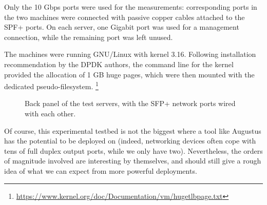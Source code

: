 \documentclass[11pt,a4paper,twoside,titlepage,openany]{book}
\begin{document}
Only the 10 Gbps ports were used for the measurements: corresponding ports in the two machines were connected with passive copper cables attached to the SPF+ ports. On each server, one Gigabit port was used for a management connection, while the remaining port was left unused.

The machines were running GNU/Linux with kernel 3.16. Following installation recommendation by the DPDK authors, the command line for the kernel provided the allocation of 1 GB huge pages, which were then mounted with the dedicated pseudo-filesystem.%
\footnote{\url{https://www.kernel.org/doc/Documentation/vm/hugetlbpage.txt}}

\begin{figure}[tb]
  \begin{center}
    \caption[Back panel of the test servers]{Back panel of the test servers, with the SFP+ network ports wired with each other.}
    \label{fig:test.servers_backpane}
  \end{center}
\end{figure}

Of course, this experimental testbed is not the biggest where a tool like Augustus has the potential to be deployed on (indeed, networking devices often cope with tens of full duplex output ports, while we only have two). Nevertheless, the orders of magnitude involved are interesting by themselves, and should still give a rough idea of what we can expect from more powerful deployments.

\end{document}
